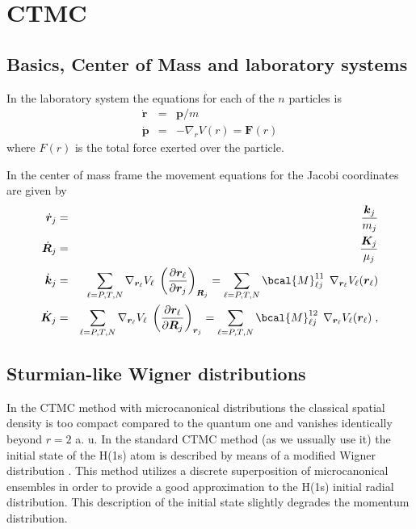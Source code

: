 \chapter{CTMC}

\section{Basics, Center of Mass and laboratory systems}

In the laboratory system the equations for each of the $n$ particles is
\begin{eqnarray*}
  \dot{\bm{r}} &=& \bm{p}/m \\
  \dot{\bm{p}} &=& - \nabla_{r} V(r) = \bm{F}(r)
\end{eqnarray*}
where $F(r)$ is the total force exerted over the particle.


In the center of mass frame the movement equations for the Jacobi
coordinates are given by
%
\begin{eqnarray} \label{Q:CTMC2}
  \dot{\bm{r}}_{j} & = &  \frac{\bm{k}_{j}}{m_{j}} \nonumber \\
  \dot{\bm{R}}_{j} & = & \frac{\bm{K}_{j}}{\mu_{j}}
  \nonumber \\
  \dot{\bm{k}}_{j} & = & \sum_{\ell = P,T,N} \nabla_{\bm{r}_{\ell}} V_{\ell} \;
  \left( \frac{\partial \bm{r}_{\ell}}{\partial \bm{r}_{j}} \right)_{\bm{R}_{j}}
  = \sum_{\ell = P,T,N} \bcal{M}^{11}_{\ell j} \;\, \nabla_{\bm{r}_{\ell}}
  V_{\ell}(\bm{r}_{\ell}) \nonumber \\
  \dot{\bm{K}}_{j} & = & \sum_{\ell = P,T,N} \nabla_{\bm{r}_{\ell}} V_{\ell} \;
  \left( \frac{\partial \bm{r}_{\ell}}{\partial \bm{R}_{j}} \right)_{\bm{r}_{j}}
  = \sum_{\ell = P,T,N} \bcal{M}^{12}_{\ell j} \;\, \nabla_{\bm{r}_{\ell}}
  V_{\ell}(\bm{r}_{\ell}) \; ,
\end{eqnarray}

\section{Sturmian-like Wigner distributions}
\label{S:sturmian-like-wigner}

In the CTMC method with microcanonical distributions the classical spatial
density is too compact compared to the quantum one and vanishes identically
beyond $r = 2$ a. u.  In the standard CTMC method (as we ussually use it) the initial
state of the H(1s) atom is described by means of a modified Wigner distribution
\parencite[see for instance][]{Hardie1983JPBp1983,Wood1997PRAp3701}. This method utilizes a discrete
superposition of microcanonical ensembles in order to provide a good
approximation to the H(1s) initial radial distribution. This description of the
initial state slightly degrades the momentum distribution.

